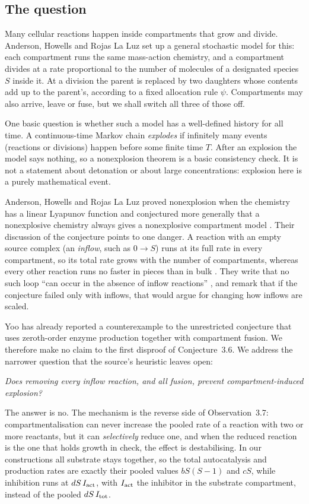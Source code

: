 \documentclass[11pt,a4paper]{article}
\numberwithin{equation}{section}
\theoremstyle{definition}\newtheorem{definition}[theorem]{Definition}
\theoremstyle{remark}\newtheorem{remark}[theorem]{Remark}\newtheorem{example}[theorem]{Example}
\begin{document}
\subsection{The question}
Many cellular reactions happen inside compartments that grow and divide. Anderson, Howells and Rojas La Luz \cite{AHRLL2026} set up a general stochastic model for this: each compartment runs the same mass-action chemistry, and a compartment divides at a rate proportional to the number of molecules of a designated species $S$ inside it. At a division the parent is replaced by two daughters whose contents add up to the parent's, according to a fixed allocation rule $\psi$. Compartments may also arrive, leave or fuse, but we shall switch all three of those off.

One basic question is whether such a model has a well-defined history for all time. A continuous-time Markov chain \emph{explodes} if infinitely many events (reactions or divisions) happen before some finite time $T$. After an explosion the model says nothing, so a nonexplosion theorem is a basic consistency check. It is not a statement about detonation or about large concentrations: explosion here is a purely mathematical event.

Anderson, Howells and Rojas La Luz proved nonexplosion when the chemistry has a linear Lyapunov function \cite[Theorem~3.1]{AHRLL2026} and conjectured more generally that a nonexplosive chemistry always gives a nonexplosive compartment model \cite[Conjecture~3.6]{AHRLL2026}. Their discussion of the conjecture points to one danger. A reaction with an empty source complex (an \emph{inflow}, such as $0\to S$) runs at its full rate in every compartment, so its total rate grows with the number of compartments, whereas every other reaction runs no faster in pieces than in bulk \cite[Observation~3.7]{AHRLL2026}. They write that no such loop ``can occur in the absence of inflow reactions'' \cite[\S3.1.1]{AHRLL2026}, and remark that if the conjecture failed only with inflows, that would argue for changing how inflows are scaled.

Yoo \cite{Yoo2026} has already reported a counterexample to the unrestricted conjecture that uses zeroth-order enzyme production together with compartment fusion. We therefore make no claim to the first disproof of Conjecture~3.6. We address the narrower question that the source's heuristic leaves open:
\begin{center}
\emph{Does removing every inflow reaction, and all fusion, prevent compartment-induced explosion?}
\end{center}
The answer is no. The mechanism is the reverse side of Observation~3.7: compartmentalisation can never increase the pooled rate of a reaction with two or more reactants, but it can \emph{selectively} reduce one, and when the reduced reaction is the one that holds growth in check, the effect is destabilising. In our constructions all substrate stays together, so the total autocatalysis and production rates are exactly their pooled values $bS(S-1)$ and $cS$, while inhibition runs at $dS\,I_{\rm act}$, with $I_{\rm act}$ the inhibitor in the substrate compartment, instead of the pooled $dS\,I_{\rm tot}$.
\end{document}
